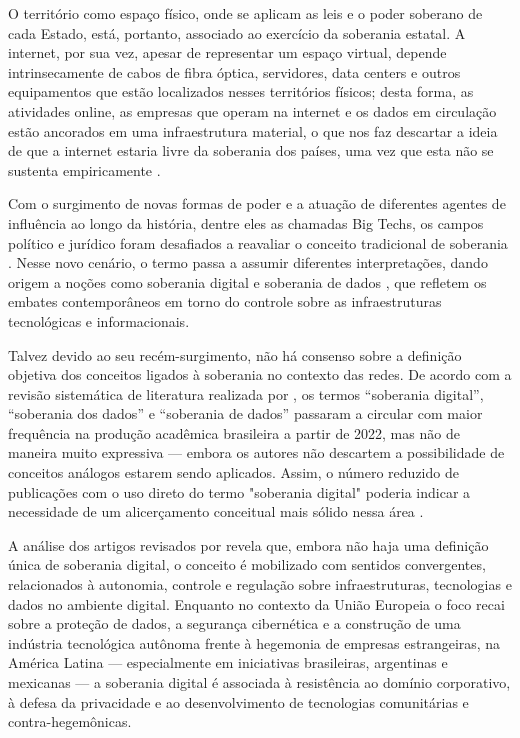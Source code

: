 O território como espaço físico, onde se aplicam as leis e o poder soberano de cada Estado, está, portanto, associado ao exercício da soberania estatal. A internet, por sua vez, apesar de representar um espaço virtual,  depende intrinsecamente de cabos de fibra óptica, servidores, data centers e outros equipamentos que estão localizados nesses territórios físicos; desta forma, as atividades online, as empresas que operam na internet e os dados em circulação estão ancorados em uma infraestrutura material, o que nos faz descartar a ideia de que a internet estaria livre da soberania dos países, uma vez que esta não se sustenta empiricamente  \cite{tecnopolitica2023}.

Com o surgimento de novas formas de poder e a atuação de diferentes agentes de influência ao longo da história, dentre eles as chamadas Big Techs, os campos político e jurídico foram desafiados a reavaliar o conceito tradicional de soberania \cite{lemos2024}. Nesse novo cenário, o termo passa a assumir diferentes interpretações, dando origem a noções como soberania digital e soberania de dados \cite{tecnopolitica2023}, que refletem os embates contemporâneos em torno do controle sobre as infraestruturas tecnológicas e informacionais.

Talvez devido ao seu recém-surgimento, não há consenso sobre a definição objetiva dos conceitos ligados à soberania no contexto das redes. De acordo com a revisão sistemática de literatura realizada por , os termos “soberania digital”, “soberania dos dados” e “soberania de dados” passaram a circular com maior frequência na produção acadêmica brasileira a partir de 2022, mas não de maneira muito expressiva — embora os autores não descartem a possibilidade de conceitos análogos estarem sendo aplicados. Assim, o número reduzido de publicações com o uso direto do termo "soberania digital" poderia indicar a necessidade de um alicerçamento conceitual mais sólido nessa área \cite{lemos2024}.

A análise dos artigos revisados por  revela que, embora não haja uma definição única de soberania digital, o conceito é mobilizado com sentidos convergentes, relacionados à autonomia, controle e regulação sobre infraestruturas, tecnologias e dados no ambiente digital. Enquanto no contexto da União Europeia o foco recai sobre a proteção de dados, a segurança cibernética e a construção de uma indústria tecnológica autônoma frente à hegemonia de empresas estrangeiras, na América Latina — especialmente em iniciativas brasileiras, argentinas e mexicanas — a soberania digital é associada à resistência ao domínio corporativo, à defesa da privacidade e ao desenvolvimento de tecnologias comunitárias e contra-hegemônicas. 


